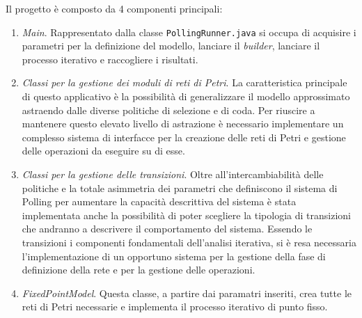 \documentclass[12pt,a4paper,italian]{article}
\begin{document}
\newpage
Il progetto è composto da 4 componenti principali: 
\begin{enumerate}
	\item \emph{Main}. Rappresentato dalla classe \texttt{PollingRunner.java} si occupa di acquisire i parametri per la definizione del modello, lanciare il \emph{builder}, lanciare il processo iterativo e raccogliere i risultati.
	\item \emph{Classi per la gestione dei moduli di reti di Petri}. La caratteristica principale di questo applicativo è la possibilità di generalizzare il modello approssimato astraendo dalle diverse politiche di selezione e di coda. Per riuscire a mantenere questo elevato livello di astrazione è necessario implementare un complesso sistema di interfacce per la creazione delle reti di Petri e gestione delle operazioni da eseguire su di esse.
	\item \emph{Classi per la gestione delle transizioni}. Oltre all'intercambiabilità delle politiche e la totale asimmetria dei parametri che definiscono il sistema di Polling per aumentare la capacità descrittiva del sistema è stata implementata anche la possibilità di poter scegliere la tipologia di transizioni che andranno a descrivere il comportamento del sistema. Essendo le transizioni i componenti fondamentali dell'analisi iterativa, si è resa necessaria l'implementazione di un opportuno sistema per la gestione della fase di definizione della rete e per la gestione delle operazioni.
	\item \emph{FixedPointModel}. Questa classe, a partire dai paramatri inseriti, crea tutte le reti di Petri necessarie e implementa il processo iterativo di punto fisso.
	
\end{enumerate}
\end{document}
